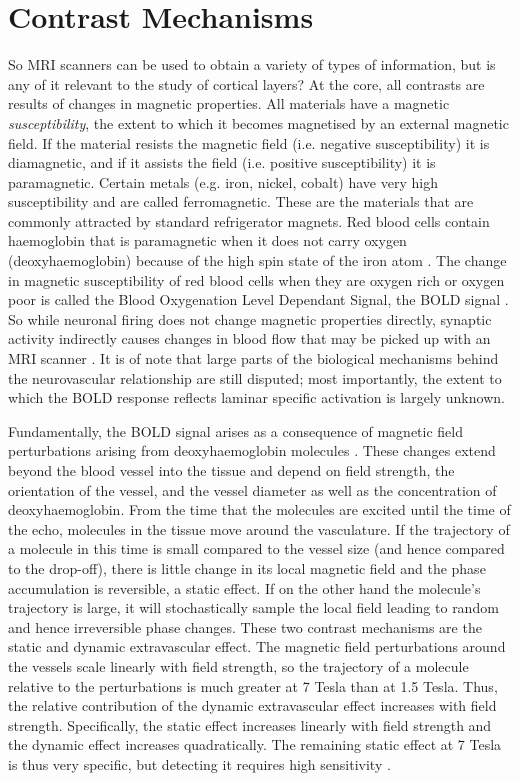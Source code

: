 \section*{Contrast Mechanisms}
So MRI scanners can be used to obtain a variety of types of information, but is any of it relevant to the study of cortical layers? At the core, all contrasts are results of changes in magnetic properties. All materials have a magnetic \emph{susceptibility}, the extent to which it becomes magnetised by an external magnetic field. If the material resists the magnetic field (i.e. negative susceptibility) it is diamagnetic, and if it assists the field (i.e. positive susceptibility) it is paramagnetic. Certain metals (e.g. iron, nickel, cobalt) have very high susceptibility and are called ferromagnetic. These are the materials that are commonly attracted by standard refrigerator magnets. Red blood cells contain haemoglobin that is paramagnetic when it does not carry oxygen (deoxyhaemoglobin) because of the high spin state of the iron atom \cite{Pauling1936}. The change in magnetic susceptibility of red blood cells when they are oxygen rich or oxygen poor is called the Blood Oxygenation Level Dependant Signal, the BOLD signal \cite{Ogawa1990}. So while neuronal firing does not change magnetic properties directly, synaptic activity indirectly causes changes in blood flow that may be picked up with an MRI scanner \cite{Logothetis2006}. It is of note that large parts of the biological mechanisms behind the neurovascular relationship are still disputed; most importantly, the extent to which the BOLD response reflects laminar specific activation is largely unknown.

Fundamentally, the BOLD signal arises as a consequence of magnetic field perturbations arising from deoxyhaemoglobin molecules \cite{Norris2006}. These changes extend beyond the blood vessel into the tissue and depend on field strength, the orientation of the vessel, and the vessel diameter as well as the concentration of deoxyhaemoglobin. From the time that the molecules are excited until the time of the echo, molecules in the tissue move around the vasculature. If the trajectory of a molecule in this time is small compared to the vessel size (and hence compared to the drop-off), there is little change in its local magnetic field and the phase accumulation is reversible, a static effect. If on the other hand the molecule's trajectory is large, it will stochastically sample the local field leading to random and hence irreversible phase changes. These two contrast mechanisms are the static and dynamic extravascular effect. The magnetic field perturbations around the vessels scale linearly with field strength, so the trajectory of a molecule relative to the perturbations is much greater at 7 Tesla than at 1.5 Tesla. Thus, the relative contribution of the dynamic extravascular effect increases with field strength. Specifically, the static effect increases linearly with field strength and the dynamic effect increases quadratically. The remaining static effect at 7 Tesla is thus very specific, but detecting it requires high sensitivity \cite{Panchuelo2014}.

